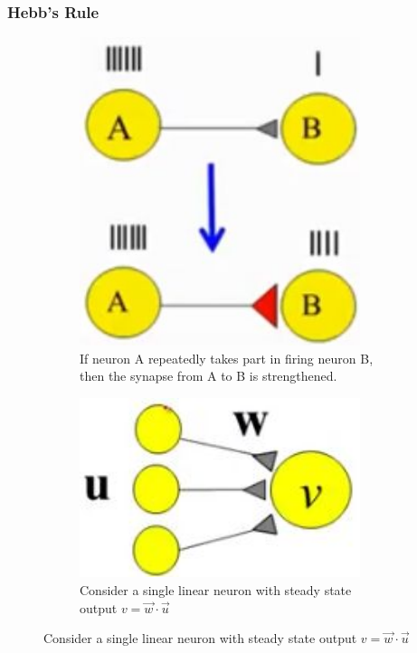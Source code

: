 \documentclass[]{article}
\begin{document}
\subsubsection{Hebb's Rule}

\begin{figure}[H]
	\begin{center}
		\caption{Formalizing Hebb's rule }
		\begin{subfigure}[b]{0.4\textwidth}
			\caption{If neuron A repeatedly takes part in firing neuron B, then the synapse from A to B is strengthened.}
			\includegraphics[width=0.9\textwidth]{hebbian-plasticity}
		\end{subfigure}
		\begin{subfigure}[b]{0.44\textwidth}
			\caption{Consider a single linear neuron with steady state output $v=\vec{w}\cdot\vec{u}$}
			\includegraphics[width=0.9\textwidth]{formalizing-hebbs-rule}
		\end{subfigure}
	\end{center}
\end{figure}
\end{document}

